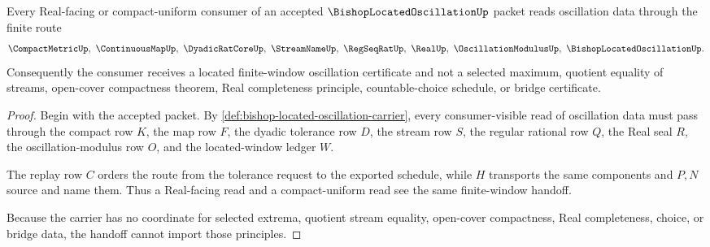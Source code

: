 \begin{theorem}
\label{thm:bishop-located-oscillation-finite-window-handoff}
Every Real-facing or compact-uniform consumer of an accepted $\BishopLocatedOscillationUp$ packet reads oscillation data through the finite route
$$
\CompactMetricUp,\ \ContinuousMapUp,\ \DyadicRatCoreUp,\ \StreamNameUp,\ \RegSeqRatUp,\ \RealUp,\ \OscillationModulusUp,\ \BishopLocatedOscillationUp .
$$
Consequently the consumer receives a located finite-window oscillation certificate and not a selected maximum, quotient equality of streams, open-cover compactness theorem, Real completeness principle, countable-choice schedule, or bridge certificate.
\end{theorem}
\begin{proof}
Begin with the accepted packet. By \autoref{def:bishop-located-oscillation-carrier}, every consumer-visible read of oscillation data must pass through the compact row $K$, the map row $F$, the dyadic tolerance row $D$, the stream row $S$, the regular rational row $Q$, the Real seal $R$, the oscillation-modulus row $O$, and the located-window ledger $W$.

The replay row $C$ orders the route from the tolerance request to the exported schedule, while $H$ transports the same components and $P,N$ source and name them. Thus a Real-facing read and a compact-uniform read see the same finite-window handoff.

Because the carrier has no coordinate for selected extrema, quotient stream equality, open-cover compactness, Real completeness, choice, or bridge data, the handoff cannot import those principles.
\end{proof}



